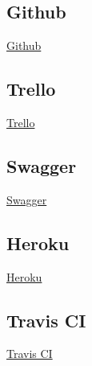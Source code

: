 \documentclass{article}
\begin{document}
		\subsection{Github}
			\href{https://github.com/KobusMarais/Cerebero}{Github}
		\subsection{Trello}
			\href{https://trello.com/b/WXh8cJZQ/demo-2}{Trello}
		\subsection{Swagger}
			\href{https://app.swaggerhub.com/apis/KobusMarais/eCivixAPI/1.0.0}{Swagger}
		\subsection{Heroku}
			\href{https://dashboard.heroku.com/apps/ecivix-testing}{Heroku}
		\subsection{Travis CI}
			\href{https://travis-ci.org/KobusMarais/Cerebero/}{Travis CI}
\end{document}
